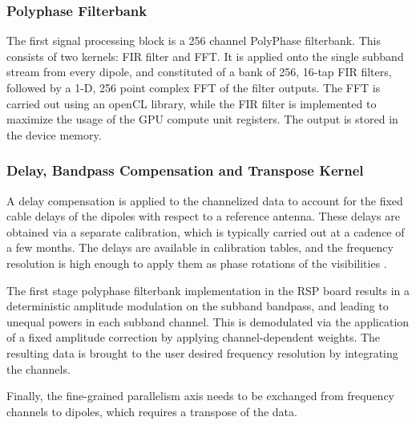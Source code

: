 \documentclass{ws-jai}
\begin{document}



\subsubsection {Polyphase Filterbank}
 The first signal processing block is a
256 channel PolyPhase  filterbank. This consists of two kernels:  FIR filter and
FFT.   It is  applied onto  the  single subband  stream from  every dipole,  and
constituted of a bank  of 256, 16-tap FIR filters, followed by  a 1-D, 256 point
complex FFT  of the  filter outputs.   The FFT  is carried  out using  an openCL
library, while the  FIR filter is implemented  to maximize the usage  of the GPU
compute unit registers. The output is stored in the device memory.\\

\subsubsection {Delay,  Bandpass Compensation and Transpose  Kernel}
 A delay
compensation is applied  to the channelized data to account  for the fixed cable
delays of  the dipoles with  respect to a  reference antenna.  These  delays are
obtained via a separate calibration, which is typically carried out at a cadence
of  a few  months.  The  delays  are available  in calibration  tables, and  the
frequency resolution  is high  enough to  apply them as  phase rotations  of the
visibilities \cite {zatman1998narrow}.

The first stage polyphase filterbank implementation  in the RSP board results in
a deterministic  amplitude modulation  on the subband  bandpass, and  leading to
unequal powers in each subband channel.  This is demodulated via the application
of  a fixed  amplitude correction  by applying  channel-dependent weights.   The
resulting  data  is  brought  to   the  user  desired  frequency  resolution  by
integrating the channels.

Finally, the  fine-grained parallelism axis  needs to be exchanged  from frequency
channels to dipoles, which requires a transpose of the data.
\end{document}
